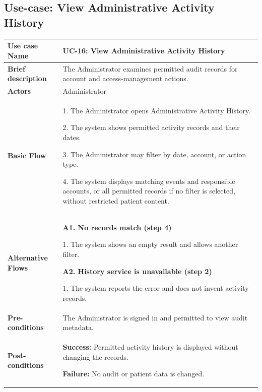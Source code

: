 \subsection{Use-case: View Administrative Activity History}
\label{uc:uc-16}

\begin{longtable}{|p{}|p{}|}
\hline

\textbf{Use case Name}
& UC-16: View Administrative Activity History
\\ \hline

\textbf{Brief description}
& The Administrator examines permitted audit records
for account and access-management actions.
\\ \hline

\textbf{Actors}
& Administrator
\\ \hline

\textbf{Basic Flow} &
1. The Administrator opens Administrative Activity History.\par
2. The system shows permitted activity records and their dates.\par
3. The Administrator may filter by date, account, or action type.\par
4. The system displays matching events and responsible accounts,
or all permitted records if no filter is selected,
without restricted patient content.
\\ \hline

\textbf{Alternative Flows} &

\textbf{A1. No records match (step 4)}\par
1. The system shows an empty result and allows another filter.

\par\smallskip

\textbf{A2. History service is unavailable (step 2)}\par
1. The system reports the error and does not invent
activity records.
\\ \hline

\textbf{Pre-conditions}
& The Administrator is signed in and permitted
to view audit metadata.
\\ \hline

\textbf{Post-conditions}
& \textbf{Success:} Permitted activity history
is displayed without changing the records.\par
\textbf{Failure:} No audit or patient data is changed.
\\ \hline

\end{longtable}


